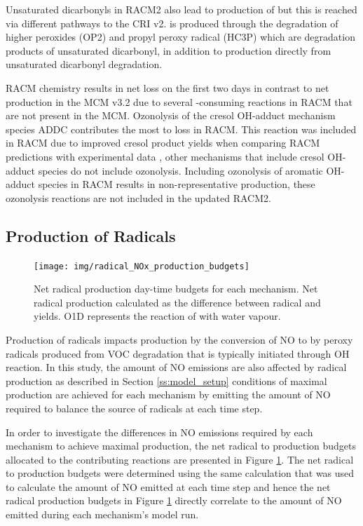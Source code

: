 Unsaturated dicarbonyls in RACM2 also lead to production of  but this is reached via different pathways to the CRI v2.
 is produced through the degradation of higher peroxides (OP2) and propyl peroxy radical (HC3P) which are degradation products of unsaturated dicarbonyl, in addition to  production directly from unsaturated dicarbonyl degradation.

RACM chemistry results in net  loss on the first two days in contrast to net  production in the MCM v3.2 due to several -consuming reactions in RACM that are not present in the MCM.
Ozonolysis of the cresol OH-adduct mechanism species ADDC contributes the most to  loss in RACM.
This reaction was included in RACM due to improved cresol product yields when comparing RACM predictions with experimental data \citep{Stockwell:1997}, other mechanisms that include cresol OH-adduct species do not include ozonolysis.
Including ozonolysis of aromatic OH-adduct species in RACM results in non-representative  production, these ozonolysis reactions are not included in the updated RACM2.

\subsection{Production of Radicals} \label{ss:radicals}

\begin{figure}
    \centering
    \texttt{[image: img/radical\_NOx\_production\_budgets]}
    \vspace{0mm}
    \caption{Net radical production day-time budgets for each mechanism. Net radical production calculated as the difference between radical and  yields. O1D represents the reaction of  with water vapour.}
    \vspace{-4mm}
    \label{f:radical_production} 
\end{figure} 

Production of radicals impacts  production by the conversion of NO to  by peroxy radicals produced from VOC degradation that is typically initiated through OH reaction.
In this study, the amount of NO emissions are also affected by radical production as described in Section \ref{ss:model_setup} conditions of maximal  production are achieved for each mechanism by emitting the amount of NO required to balance the source of radicals at each time step. 

In order to investigate the differences in NO emissions required by each mechanism to achieve maximal  production, the net radical to  production budgets allocated to the contributing reactions are presented in Figure \ref{f:radical_production}.
The net radical to  production budgets were determined using the same calculation that was used to calculate the amount of NO emitted at each time step and hence the net radical production budgets in Figure \ref{f:radical_production} directly correlate to the amount of NO emitted during each mechanism's model run.

